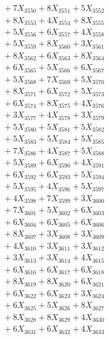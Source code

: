 \documentclass[a4paper,10pt]{article}
\begin{document}
{\begin{align}
&\;  + 7 X_{3550} + 8 X_{3551} + 5 X_{3552} \\[0.3ex]
&\;  + 8 X_{3553} + 4 X_{3554} + 8 X_{3555} \\[0.3ex]
&\;  + 5 X_{3556} + 6 X_{3557} + 4 X_{3558} \\[0.3ex]
&\;  + 5 X_{3559} + 8 X_{3560} + 3 X_{3561} \\[0.3ex]
&\;  + 8 X_{3562} + 6 X_{3563} + 8 X_{3564} \\[0.3ex]
&\;  + 6 X_{3565} + 5 X_{3566} + 6 X_{3567} \\[0.3ex]
&\;  + 5 X_{3568} + 7 X_{3569} + 5 X_{3570} \\[0.3ex]
&\;  + 8 X_{3571} + 6 X_{3572} + 5 X_{3573} \\[0.3ex]
&\;  + 6 X_{3574} + 8 X_{3575} + 4 X_{3576} \\[0.3ex]
&\;  + 3 X_{3577} + 4 X_{3578} + 3 X_{3579} \\[0.5ex]\allowbreak
&\;  + 5 X_{3580} + 5 X_{3581} + 5 X_{3582} \\[0.3ex]
&\;  + 5 X_{3583} + 5 X_{3584} + 5 X_{3585} \\[0.3ex]
&\;  + 7 X_{3586} + 4 X_{3587} + 5 X_{3588} \\[0.3ex]
&\;  + 5 X_{3589} + 6 X_{3590} + 4 X_{3591} \\[0.3ex]
&\;  + 6 X_{3592} + 6 X_{3593} + 5 X_{3594} \\[0.3ex]
&\;  + 5 X_{3595} + 4 X_{3596} + 5 X_{3597} \\[0.3ex]
&\;  + 4 X_{3598} + 7 X_{3599} + 3 X_{3600} \\[0.3ex]
&\;  + 7 X_{3601} + 5 X_{3602} + 6 X_{3603} \\[0.3ex]
&\;  + 6 X_{3604} + 6 X_{3605} + 6 X_{3606} \\[0.3ex]
&\;  + 8 X_{3607} + 3 X_{3608} + 3 X_{3609} \\[0.5ex]\allowbreak
&\;  + 4 X_{3610} + 3 X_{3611} + 3 X_{3612} \\[0.3ex]
&\;  + 3 X_{3613} + 3 X_{3614} + 4 X_{3615} \\[0.3ex]
&\;  + 6 X_{3616} + 6 X_{3617} + 6 X_{3618} \\[0.3ex]
&\;  + 8 X_{3619} + 8 X_{3620} + 6 X_{3621} \\[0.3ex]
&\;  + 6 X_{3622} + 6 X_{3623} + 3 X_{3624} \\[0.3ex]
&\;  + 6 X_{3625} + 5 X_{3626} + 8 X_{3627} \\[0.3ex]
&\;  + 8 X_{3628} + 8 X_{3629} + 4 X_{3630} \\[0.3ex]
&\;  + 6 X_{3631} + 6 X_{3632} + 4 X_{3633} \\[0.3ex]

\end{align}}
\end{document}
